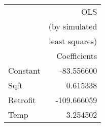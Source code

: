 \begin{tabular}{lr}
\toprule
{} &            OLS \\
{} &  (by simulated \\
{} & least squares) \\
{} &   Coefficients \\
\midrule
Constant &     -83.556600 \\
Sqft     &       0.615338 \\
Retrofit &    -109.666059 \\
Temp     &       3.254502 \\
\bottomrule
\end{tabular}

